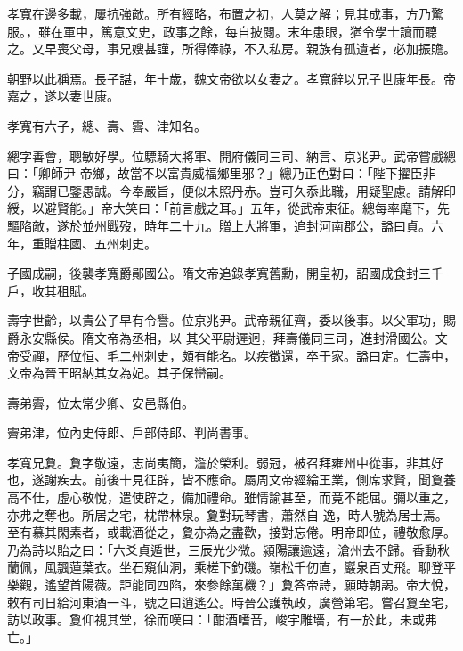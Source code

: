 \begin{pinyinscope}
 孝寬在邊多載，屢抗強敵。所有經略，布置之初，人莫之解；見其成事，方乃驚服。，雖在軍中，篤意文史，政事之餘，每自披閱。末年患眼，猶令學士讀而聽之。又早喪父母，事兄嫂甚謹，所得俸祿，不入私房。親族有孤遺者，必加振贍。



 朝野以此稱焉。長子諶，年十歲，魏文帝欲以女妻之。孝寬辭以兄子世康年長。帝嘉之，遂以妻世康。



 孝寬有六子，總、壽、霽、津知名。



 總字善會，聰敏好學。位驃騎大將軍、開府儀同三司、納言、京兆尹。武帝嘗戲總曰：「卿師尹
 帝鄉，故當不以富貴威福鄉里邪？」總乃正色對曰：「陛下擢臣非分，竊謂已鑒愚誠。今奉嚴旨，便似未照丹赤。豈可久忝此職，用疑聖慮。請解印綬，以避賢能。」帝大笑曰：「前言戲之耳。」五年，從武帝東征。總每率麾下，先驅陷敵，遂於並州戰歿，時年二十九。贈上大將軍，追封河南郡公，謚曰貞。六年，重贈柱國、五州刺史。



 子國成嗣，後襲孝寬爵鄖國公。隋文帝追錄孝寬舊勳，開皇初，詔國成食封三千戶，收其租賦。



 壽字世齡，以貴公子早有令譽。位京兆尹。武帝親征齊，委以後事。以父軍功，賜爵永安縣侯。隋文帝為丞相，以
 其父平尉遲迥，拜壽儀同三司，進封滑國公。文帝受禪，歷位恒、毛二州刺史，頗有能名。以疾徵還，卒于家。謚曰定。仁壽中，文帝為晉王昭納其女為妃。其子保巒嗣。



 壽弟霽，位太常少卿、安邑縣伯。



 霽弟津，位內史侍郎、戶部侍郎、判尚書事。



 孝寬兄夐。夐字敬遠，志尚夷簡，澹於榮利。弱冠，被召拜雍州中從事，非其好也，遂謝疾去。前後十見征辟，皆不應命。屬周文帝經綸王業，側席求賢，聞夐養高不仕，虛心敬悅，遣使辟之，備加禮命。雖情諭甚至，而竟不能屈。彌以重之，亦弗之奪也。所居之宅，枕帶林泉。夐對玩琴書，蕭然自
 逸，時人號為居士焉。至有慕其閑素者，或載酒從之，夐亦為之盡歡，接對忘倦。明帝即位，禮敬愈厚。乃為詩以貽之曰：「六爻貞遁世，三辰光少微。潁陽讓逾遠，滄州去不歸。香動秋蘭佩，風飄蓮葉衣。坐石窺仙洞，乘槎下釣磯。嶺松千仞直，巖泉百丈飛。聊登平樂觀，遙望首陽薇。詎能同四陷，來參餘萬機？」夐答帝詩，願時朝謁。帝大悅，敕有司日給河東酒一斗，號之曰逍遙公。時晉公護執政，廣營第宅。嘗召夐至宅，訪以政事。夐仰視其堂，徐而嘆曰：「酣酒嗜音，峻宇雕墻，有一於此，未或弗亡。」




\end{pinyinscope}
